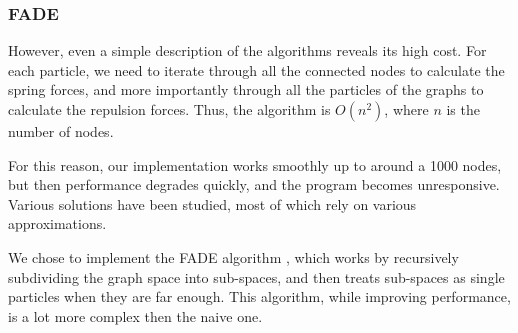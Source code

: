 \documentclass[a4paper,11pt,titlepage]{article}
\begin{document}
\subsubsection{FADE}

However, even a simple description of the algorithms reveals its high cost. For each
particle, we need to iterate through all the connected nodes to calculate the spring
forces, and more importantly through all the particles of the graphs to calculate the
repulsion forces. Thus, the algorithm is $O(n^2)$, where $n$ is the number of nodes.

For this reason, our implementation works smoothly up to around a 1000 nodes, but then
performance degrades quickly, and the program becomes unresponsive. Various solutions have
been studied, most of which rely on various approximations.

We chose to implement the FADE algorithm \cite{fade}, which works by recursively
subdividing the graph space into sub-spaces, and then treats sub-spaces as single
particles when they are far enough. This algorithm, while improving performance, is a lot
more complex then the naive one.
\end{document}
